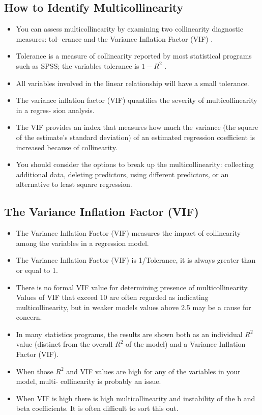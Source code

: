\documentclass[a4paper,12pt]{article}
\begin{document}
\subsection{How to Identify Multicollinearity}
\begin{itemize}
\item You can assess multicollinearity by examining two collinearity diagnostic measures: tol-
erance and the Variance Inflation Factor (VIF) .
\item Tolerance is a measure of collinearity reported by most statistical programs such as SPSS;
the variables tolerance is $1 - R^2$ .
\item All variables involved in the linear relationship will have a small tolerance.

\item The variance inflation factor (VIF) quantifies the severity of multicollinearity in a regres-
sion analysis.
\item The VIF provides an index that measures how much the variance (the square of the
estimate’s standard deviation) of an estimated regression coefficient is increased because
of collinearity.


\item  You should consider the options to break up the multicollinearity: collecting additional data, deleting predictors, using different predictors, or an alternative to least square regression.

\end{itemize}
\subsection*{The Variance Inflation Factor (VIF)}
\begin{itemize}
\item The Variance Inflation Factor (VIF) measures the impact of collinearity among the variables in a regression model.
\item The Variance Inflation Factor (VIF) is 1/Tolerance, it is always greater than or equal to
1.
\item There is no formal VIF value for determining presence of multicollinearity. Values of VIF
that exceed 10 are often regarded as indicating multicollinearity, but in weaker models
values above 2.5 may be a cause for concern.
\item In many statistics programs, the results are shown both as an individual $R^2$ value (distinct
from the overall $R^2$ of the model) and a Variance Inflation Factor (VIF).
\item When those $R^2$ and VIF values are high for any of the variables in your model, multi-
collinearity is probably an issue.

\item When VIF is high there is high multicollinearity and instability of the b and beta coefficients. It is often difficult to sort this out. 




\end{itemize}
\end{document}

